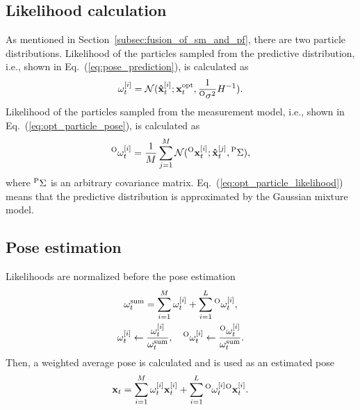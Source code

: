 \documentclass[letterpaper, 10 pt, conference]{ieeeconf}  %
\begin{document}
\subsection{Likelihood calculation}

As mentioned in Section~\ref{subsec:fusion_of_sm_and_pf}, there are two particle distributions.
Likelihood of the particles sampled from the predictive distribution, i.e., shown in Eq.~(\ref{eq:pose_prediction}), is calculated as
%
\begin{align}
    \omega_{t}^{[i]} = \mathcal{N}({\bf \hat{x}}_{t}^{[i]}; {\bf x}_{t}^{{\rm opt}}, \frac{1}{{}^{\rm O}\sigma^{2}}H^{-1}).
    \label{eq:particle_likelihood}
\end{align}
%
Likelihood of the particles sampled from the measurement model, i.e., shown in Eq.~(\ref{eq:opt_particle_pose}), is calculated as
%
\begin{align}
    {}^{\rm O}\omega_{t}^{[i]} = \frac{1}{M} \sum_{j=1}^{M} \mathcal{N}({}^{\rm O}{\bf x}_{t}^{[i]}; {\bf \hat{x}}_{t}^{[j]}, {}^{\rm P}\Sigma),
    \label{eq:opt_particle_likelihood}
\end{align}
%
where ${}^{\rm P}\Sigma$ is an arbitrary covariance matrix.
Eq.~(\ref{eq:opt_particle_likelihood}) means that the predictive distribution is approximated by the Gaussian mixture model.



\subsection{Pose estimation}

Likelihoods are normalized before the pose estimation
%
\begin{align}
    \begin{gathered}
        \omega_{t}^{{\rm sum}} = \sum_{i=1}^{M} \omega_{t}^{[i]} + \sum_{i=1}^{L} {}^{\rm O}\omega_{t}^{[i]}, \\
        \omega_{t}^{[i]} \leftarrow \frac{\omega_{t}^{[i]}}{\omega_{t}^{{\rm sum}}}, ~~~ {}^{\rm O}\omega_{t}^{[i]} \leftarrow \frac{{}^{\rm O}\omega_{t}^{[i]}}{\omega_{t}^{{\rm sum}}}.
    \end{gathered}
    \label{eq:normalization}
\end{align}
%
Then, a weighted average pose is calculated and is used as an estimated pose
%
\begin{align}
    {\bf x}_{t} = \sum_{i=1}^{M} \omega_{t}^{[i]} {\bf x}_{t}^{[i]} + \sum_{i=1}^{L} {}^{\rm O}\omega_{t}^{[i]} {}^{\rm O}{\bf x}_{t}^{[i]}.
\end{align}
\end{document}
